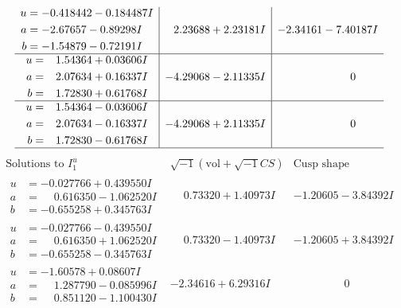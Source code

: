 \documentclass[1p]{elsarticle_modified}
\theoremstyle{definition}
\newcommand{\I}{\sqrt{-1}}
\begin{document}
$$\begin{array}{c|c|c}
\begin{aligned}
u &= -0.418442 - 0.184487 I \\
a &= -2.67657 - 0.89298 I \\
b &= -1.54879 - 0.72191 I\end{aligned}
 & \phantom{-}2.23688 + 2.23181 I & -2.34161 - 7.40187 I \\ \hline\begin{aligned}
u &= \phantom{-}1.54364 + 0.03606 I \\
a &= \phantom{-}2.07634 + 0.16337 I \\
b &= \phantom{-}1.72830 + 0.61768 I\end{aligned}
 & -4.29068 - 2.11335 I & \phantom{-0.000000 } 0 \\ \hline\begin{aligned}
u &= \phantom{-}1.54364 - 0.03606 I \\
a &= \phantom{-}2.07634 - 0.16337 I \\
b &= \phantom{-}1.72830 - 0.61768 I\end{aligned}
 & -4.29068 + 2.11335 I & \phantom{-0.000000 } 0\\
 \hline 
 \end{array}$$\newpage$$\begin{array}{c|c|c}  
\text{Solutions to }I^u_{1}& \I (\text{vol} + \sqrt{-1}CS) & \text{Cusp shape}\\
 \hline 
\begin{aligned}
u &= -0.027766 + 0.439550 I \\
a &= \phantom{-}0.616350 - 1.062520 I \\
b &= -0.655258 + 0.345763 I\end{aligned}
 & \phantom{-}0.73320 + 1.40973 I & -1.20605 - 3.84392 I \\ \hline\begin{aligned}
u &= -0.027766 - 0.439550 I \\
a &= \phantom{-}0.616350 + 1.062520 I \\
b &= -0.655258 - 0.345763 I\end{aligned}
 & \phantom{-}0.73320 - 1.40973 I & -1.20605 + 3.84392 I \\ \hline\begin{aligned}
u &= -1.60578 + 0.08607 I \\
a &= \phantom{-}1.287790 - 0.085996 I \\
b &= \phantom{-}0.851120 - 1.100430 I\end{aligned}
 & -2.34616 + 6.29316 I & \phantom{-0.000000 } 0 \\ \hline\begin{aligned}

\end{aligned}
\end{array}$$
\end{document}
